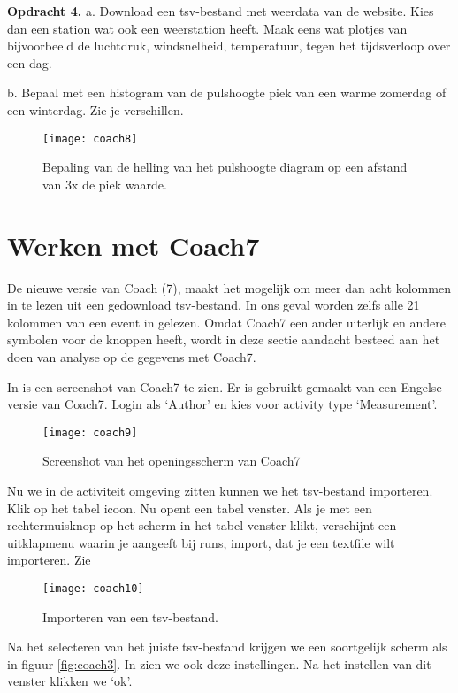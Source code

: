 \textbf{Opdracht 4.}
a.
Download een tsv-bestand met weerdata van de \hisparc website.
Kies dan een \hisparc station wat ook een weerstation heeft.
Maak eens wat plotjes van bijvoorbeeld de luchtdruk, windsnelheid, temperatuur,
tegen het tijdsverloop over een dag.

b. Bepaal met een histogram van de pulshoogte piek van een warme zomerdag of
een winterdag. Zie je verschillen.

\begin{figure}
    \centering
    \texttt{[image: coach8]}
    \caption{Bepaling van de helling van het pulshoogte diagram op een afstand
    van 3x de piek waarde.}
    \label{fig:coach8}
\end{figure}

\section{Werken met Coach7}

De nieuwe versie van Coach (7), maakt het mogelijk om meer dan acht kolommen in te lezen
uit een gedownload tsv-bestand. In ons geval worden zelfs alle 21 kolommen van een event in gelezen.
Omdat Coach7 een ander uiterlijk en andere symbolen voor de knoppen heeft, wordt
in deze sectie aandacht besteed aan het doen van analyse op de gegevens met Coach7.

In  is een screenshot van Coach7 te zien. Er is gebruikt gemaakt van een Engelse versie van
Coach7. Login als `Author' en kies voor activity type `Measurement'.

\begin{figure}
    \centering
    \texttt{[image: coach9]}
    \caption{Screenshot van het openingsscherm van Coach7}
    \label{fig:coach9}
\end{figure}

Nu we in de activiteit omgeving zitten kunnen we het tsv-bestand importeren.
Klik op het tabel icoon. Nu opent een tabel venster.
Als je met een rechtermuisknop op het scherm in het tabel venster klikt, verschijnt
een uitklapmenu waarin je aangeeft bij runs, import, dat je een textfile wilt importeren.
Zie 

\begin{figure}
    \centering
    \texttt{[image: coach10]}
    \caption{Importeren van een tsv-bestand.}
    \label{fig:coach10}
\end{figure}

Na het selecteren van het juiste tsv-bestand krijgen we een soortgelijk scherm
als in figuur \ref{fig:coach3}. In  zien we ook deze instellingen.
Na het instellen van dit venster klikken we `ok'.

